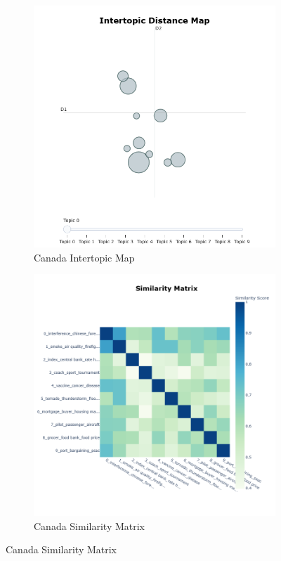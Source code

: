 \documentclass{article}
\theoremstyle{mytheoremstyle}
\theoremstyle{mytheoremstyle}
\theoremstyle{myproblemstyle}
\begin{document}
    \begin{figure}[hp]

        \centering
        \begin{subfigure}{0.45\textwidth}
            \includegraphics[width=\textwidth]{../images/plots/Canada/intertopic_distance_map_canada.png}
            \caption{Canada Intertopic Map}
            \label{fig:intertopic_canada}
        \end{subfigure}
        \hfill
        \begin{subfigure}{0.45\textwidth}
            \includegraphics[width=\textwidth]{../images/plots/Canada/similarity_matrix_canada.png}
            \caption{Canada Similarity Matrix}
            \label{fig:sim_canada}
        \end{subfigure}
        \hfill
        

\end{figure}
\end{document}

